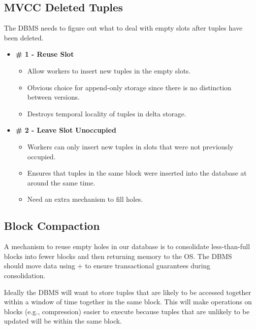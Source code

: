 \documentclass[11pt]{article}
\begin{document}
\subsection*{MVCC Deleted Tuples}
The DBMS needs to figure out what to deal with empty slots after tuples have been deleted.
\begin{itemize}
    \item \textbf{\# 1 - Reuse Slot}
\begin{itemize}
    \item Allow workers to insert new tuples in the empty slots.
    \item Obvious choice for append-only storage since there is no distinction between versions.
    \item Destroys temporal locality of tuples in delta storage.
\end{itemize}
    \item \textbf{\# 2 - Leave Slot Unoccupied}
    \begin{itemize}
        \item Workers can only insert new tuples in slots that were not previously occupied.
        \item Ensures that tuples in the same block were inserted into the database at around the same time.
        \item Need an extra mechanism to fill holes.
    \end{itemize}
    \end{itemize}
\subsection*{Block Compaction}
A mechanism to reuse empty holes in our database is to consolidate less-than-full blocks into fewer blocks and then returning memory to the OS. The DBMS should move data using +  to ensure
transactional guarantees during consolidation.

Ideally the DBMS will want to store tuples that are likely to be accessed together within a window of time together in the same block. This will make operations on blocks (e.g., compression) easier to execute because tuples that are unlikely to be updated will be within the same block.
\end{document}
